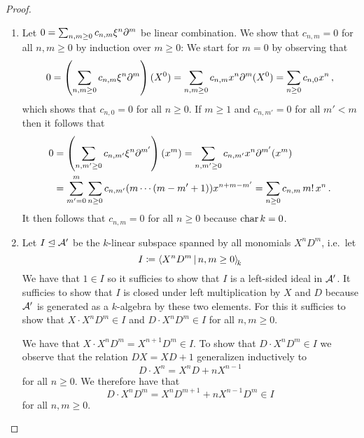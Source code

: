 \begin{proof}
  \leavevmode
  \begin{enumerate}
    \item
      Let $0 = \sum_{n, m \geq 0} c_{n,m} \xi^n \partial^m$ be linear combination.
      We show that $c_{n,m} = 0$ for all $n, m \geq 0$ by induction over $m \geq 0$:
      We start for $m = 0$ by observing that
      \[
          0
        = \left( \sum_{n, m \geq 0} c_{n,m} \xi^n \partial^m \right)(X^0)
        = \sum_{n, m \geq 0} c_{n,m} x^n \partial^m(X^0)
        = \sum_{n \geq 0} c_{n,0} x^n \,,
      \]
      which shows that $c_{n,0} = 0$ for all $n \geq 0$.
      If $m \geq 1$ and $c_{n,m'} = 0$ for all $m' < m$ then it follows that
      \begin{align*}
            0
        &=  \left( \sum_{n, m' \geq 0} c_{n,m'} \xi^n \partial^{m'} \right)(x^m)
         =  \sum_{n, m' \geq 0} c_{n,m'} x^n \partial^{m'}(x^m)
        \\
        &=  \sum_{m'=0}^m \sum_{n \geq 0} c_{n,m'} (m \dotsm (m-m'+1)) x^{n+m-m'}
         =  \sum_{n \geq 0} c_{n,m} \, m! \, x^n \,.
      \end{align*}
      It then follows that $c_{n,m} = 0$ for all $n \geq 0$ because $\operatorname{char} k = 0$.
    \item
      Let $I \trianglelefteq \mathcal{A}'$ be the $k$-linear subspace spanned by all monomials $X^n D^m$, i.e.\ let
      \[
                  I
        \defined  \left\langle
                    X^n D^m
                  \suchthat*
                    n, m \geq 0
                  \right\rangle_{\!k}
      \]
      We have that $1 \in I$ so it sufficies to show that $I$ is a left-sided ideal in $\mathcal{A}'$.
      It sufficies to show that $I$ is closed under left multiplication by $X$ and $D$ because $\mathcal{A}'$ is generated as a $k$-algebra by these two elements.
      For this it sufficies to show that $X \cdot X^n D^m \in I$ and $D \cdot X^n D^m \in I$ for all $n, m \geq 0$.
      
      We have that $X \cdot X^n D^m = X^{n+1} D^m \in I$.
      To show that $D \cdot X^n D^m \in I$ we observe that the relation $DX = XD + 1$ generalizen inductively to
      \[
          D \cdot X^n
        = X^n D + n X^{n-1}
      \]
      for all $n \geq 0$.
      We therefore have that
      \begin{equation}
      \label{equation: commutes op to smaller degree step 1}
            D \cdot X^n D^m
        =   X^n D^{m+1} + n X^{n-1} D^m
        \in I
      \end{equation}
      for all $n, m \geq 0$.
    \qedhere
  \end{enumerate}
\end{proof}


